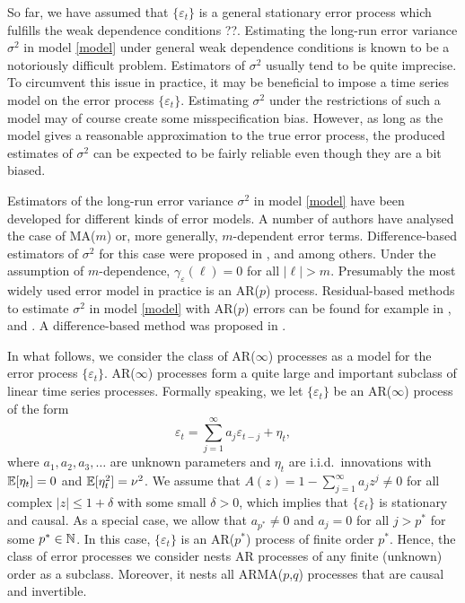 So far, we have assumed that $\{ \varepsilon_t \}$ is a general stationary error process which fulfills the weak dependence conditions ??. Estimating the long-run error variance $\sigma^2$ in model \eqref{model} under general weak dependence conditions is known to be a notoriously difficult problem. Estimators of $\sigma^2$ usually tend to be quite imprecise. To circumvent this issue in practice, it may be beneficial to impose a time series model on the error process $\{\varepsilon_t\}$. Estimating $\sigma^2$ under the restrictions of such a model may of course create some misspecification bias. However, as long as the model gives a reasonable approximation to the true error process, the produced estimates of $\sigma^2$ can be expected to be fairly reliable even though they are a bit biased. 


Estimators of the long-run error variance $\sigma^2$ in model \eqref{model} have been developed for different kinds of error models. A number of authors have analysed the case of MA($m$) or, more generally, $m$-dependent error terms. Difference-based estimators of $\sigma^2$ for this case were proposed in \cite{MuellerStadtmueller1988}, \cite{Herrmann1992} and \cite{Munk2017} among others. Under the assumption of $m$-dependence, $\gamma_\varepsilon(\ell) = 0$ for all $|\ell| > m$. 
Presumably the most widely used error model in practice is an AR($p$) process. Residual-based methods to estimate $\sigma^2$ in model \eqref{model} with AR($p$) errors can be found for example in \cite{Truong1991}, \cite{ShaoYang2011} and \cite{QiuShaoYang2013}. A difference-based method was proposed in \cite{Hall2003}. 


In what follows, we consider the class of AR($\infty$) processes as a model for the error process $\{ \varepsilon_t \}$. AR($\infty$) processes form a quite large and important subclass of linear time series processes. Formally speaking, we let $\{\varepsilon_t\}$ be an AR($\infty$) process of the form 
\begin{equation}\label{AR-errors} 
\varepsilon_t = \sum_{j=1}^\infty a_j \varepsilon_{t-j} + \eta_t, 
\end{equation} 
where $a_1,a_2,a_3,\ldots$ are unknown parameters and $\eta_t$ are i.i.d.\ innovations with $\mathbb{E}[\eta_t] = 0$ and $\mathbb{E}[\eta_t^2] = \nu^2$. We assume that $A(z) = 1 - \sum_{j=1}^{\infty} a_j z^j \ne 0$ for all complex $|z| \le 1 + \delta$ with some small $\delta > 0$, which implies that $\{ \varepsilon_t \}$ is stationary and causal. As a special case, we allow that $a_{p^*} \ne 0$ and $a_j = 0$ for all $j > p^*$ for some $p^* \in \mathbb{N}$. In this case, $\{ \varepsilon_t \}$ is an AR($p^*$) process of finite order $p^*$. Hence, the class of error processes we consider nests AR processes of any finite (unknown) order as a subclass. Moreover, it nests all ARMA($p$,$q$) processes that are causal and invertible. 


